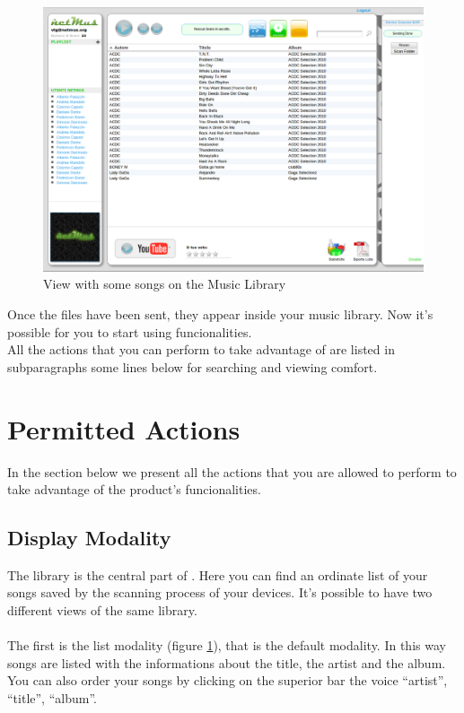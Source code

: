 \begin{figure}[!htbp]
  \centering
  \includegraphics[width=15cm]{img/MU/song_loaded.png}
\caption{View with some songs on the Music Library}
\label{fig:fineUpload}
\end{figure}

Once the files have been sent, they appear inside your music library.
Now it's possible for you to start using  funcionalities.\\

All the actions that you can perform to take advantage of  are listed
in subparagraphs some lines below for searching and viewing comfort.

\newpage
\section{Permitted Actions}
In the section below we present all the actions that you are allowed to perform
to take advantage of the product's funcionalities.

\subsection{Display Modality}

The library is the central part of . Here you can find an ordinate
list of your songs saved by the scanning process of your devices. It's possible
to have two different views of the same library.\\
\\
The first is the list modality (figure \ref{fig:fineUpload}), that is the
default modality. In this way songs are listed with the informations about the title, the artist and the
album. You can also order your songs by clicking on the superior bar the voice
``artist'', ``title'', ``album''.\\


